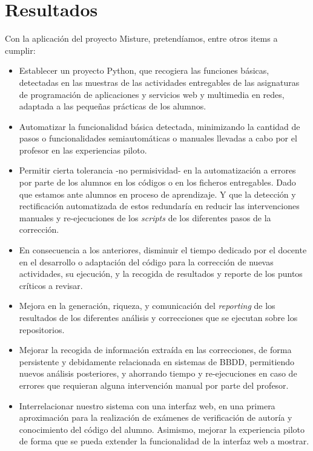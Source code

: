 \cleardoublepage
\chapter{Resultados}
\label{chap:resultados}

Con la aplicación del proyecto Misture, pretendíamos, entre otros items a cumplir:\\


\begin{itemize}
\item Establecer un proyecto Python, que recogiera las funciones básicas, detectadas en las muestras de las actividades entregables de las asignaturas de programación de aplicaciones y servicios web y multimedia en redes, adaptada a las pequeñas prácticas de los alumnos.

\item Automatizar la funcionalidad básica detectada, minimizando la cantidad de pasos o funcionalidades semiautomáticas o manuales llevadas a cabo por el profesor en las experiencias piloto.

\item Permitir cierta tolerancia -no permisividad- en la automatización a errores por parte de los alumnos en los códigos o en los ficheros entregables. Dado que estamos ante alumnos en proceso de aprendizaje. Y que la detección y rectificación automatizada de estos redundaría en reducir las intervenciones manuales y re-ejecuciones de los \textit{scripts} de los diferentes pasos de la corrección.

\item En consecuencia a los anteriores, disminuir el tiempo dedicado por el docente en el desarrollo o adaptación del código para la corrección de nuevas actividades, su ejecución, y la recogida de resultados y reporte de los puntos críticos a revisar.

\item Mejora en la generación, riqueza, y comunicación del \textit{reporting} de los resultados de los diferentes análisis y correcciones que se ejecutan sobre los repositorios.

\item Mejorar la recogida de información extraída en las correcciones, de forma persistente y debidamente relacionada en sistemas de BBDD, permitiendo nuevos análisis posteriores, y ahorrando tiempo y re-ejecuciones en caso de errores que requieran alguna intervención manual por parte del profesor.

\item Interrelacionar nuestro sistema con una interfaz web, en una primera aproximación para la realización de exámenes de verificación de autoría y conocimiento del código del alumno. Asimismo, mejorar la experiencia piloto de forma que se pueda extender la funcionalidad de la interfaz web a mostrar.
\end{itemize}

